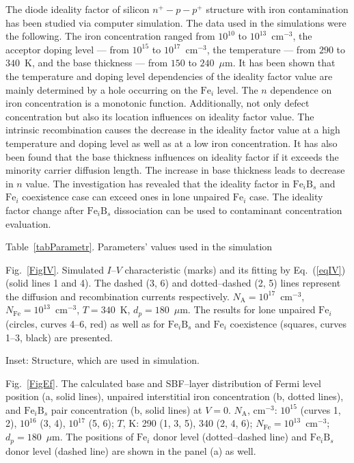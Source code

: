 \documentclass[12pt]{article}
\begin{document}
The diode ideality factor of silicon $n^+-p-p^+$ structure with iron contamination has been studied via computer simulation.
The data used in the simulations were the following.
The iron concentration ranged from $10^{10}$ to $10^{13}$~cm$^{-3}$,
the acceptor doping level --- from $10^{15}$ to $10^{17}$~cm$^{-3}$,
the temperature --- from $290$ to $340$~K,
and the base thickness --- from $150$ to $240$~$\mu$m.
It has been shown that the temperature and doping level dependencies of the ideality factor value
are mainly determined by a hole occurring on the $\mathrm{Fe}_i$ level.
The $n$ dependence on iron concentration is a monotonic function.
Additionally, not only defect concentration but also its location influences on  ideality factor value.
The intrinsic recombination causes the decrease in the ideality factor value at a high temperature and doping level as well as at a low iron concentration.
It has also been found that the base thickness influences on ideality factor if it exceeds the minority carrier diffusion length.
The increase in base thickness leads to decrease in $n$ value.
The investigation has revealed that the ideality factor in $\mathrm{Fe}_i\mathrm{B}_s$ and $\mathrm{Fe}_i$ coexistence case
can exceed ones in lone unpaired $\mathrm{Fe}_i$ case.
The ideality factor change after $\mathrm{Fe}_i\mathrm{B}_s$ dissociation can be used to contaminant concentration evaluation.





\newpage

Table~\ref{tabParametr}.
Parameters' values used in the simulation

 Fig.~\ref{FigIV}.
Simulated $I$--$V$ characteristic (marks) and its fitting by Eq.~(\ref{eqIV}) (solid lines 1 and 4).
The dashed (3, 6) and dotted–dashed (2, 5) lines represent the diffusion and recombination currents respectively.
$N_\mathrm{A}=10^{17}$~cm$^{-3}$, $N_\mathrm{Fe}=10^{13}$~cm$^{-3}$, $T=340$~K, $d_p=180$~$\mu$m.
The results for lone unpaired $\mathrm{Fe}_i$ (circles, curves 4--6, red) as well as for $\mathrm{Fe}_i\mathrm{B}_s$ and $\mathrm{Fe}_i$ coexistence
(squares, curves 1--3, black) are presented.

Inset: Structure, which are used in simulation.



 Fig.~\ref{FigEf}.
The calculated base and SBF--layer distribution of Fermi level position (a, solid lines), unpaired interstitial iron concentration (b, dotted lines),
and $\mathrm{Fe}_i\mathrm{B}_s$ pair concentration (b, solid lines) at $V=0$.
$N_\mathrm{A}$, cm$^{-3}$: $10^{15}$ (curves 1, 2), $10^{16}$ (3, 4), $10^{17}$ (5, 6);
$T$, K: 290 (1, 3, 5), 340 (2, 4, 6);
$N_\mathrm{Fe}=10^{13}$~cm$^{-3}$;
$d_p=180$~$\mu$m.
The positions of $\mathrm{Fe}_i$ donor level (dotted--dashed line) and $\mathrm{Fe}_i\mathrm{B}_s$
 donor level (dashed line) are shown in the panel (a) as well.
\end{document}
